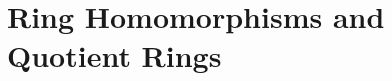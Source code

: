 \documentclass[9pt]{book}
\begin{document}
\begin{comment}
      \section{Homomorphisms And Isomorphisms}
         
      \section{Group Actions}
         
         
   \chapter{Subgroups}
      \section{Definition And Examples}
         
      \section{Centralizers And Normalizers, Stabilizes And Kernels}
         
      \section{Cyclic Groups And Cyclic Subgroups}
         
      \section{Subgroups Generated By Subsets Of A Group}
         
      \section{The Lattice Of Subgroups Of A Subgroup}
         
         
   \chapter{Introduction To Rings}
      \section{Basic Definition And Examples}
         
      \section{Examples: Polynomial Rings, Matrix Rings, And Group Rings}
         
      \section{Ring Homomorphisms and Quotient Rings}
         
\end{comment}
      \section{Ring Homomorphisms and Quotient Rings}
         
\end{document}
